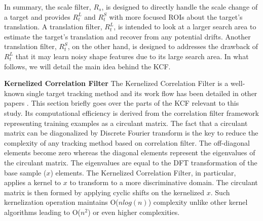 \documentclass[10pt,twocolumn,letterpaper]{article}
\begin{document}
In summary, the scale filter, $R_{s}$, is designed to directly handle
the scale change of a target and provides $R_{t}^{L}$ and $R_{t}^{S}$
with more focused ROIs about the target's translation. A translation
filter, $R_{t}^{L}$, is intended to look at a larger search area to
estimate the target's translation and recover from any potential
drifts. Another translation filter, $R_{t}^{S}$, on the other hand, is
designed to addresses the drawback of $R_{t}^{L}$ that it may learn
noisy shape features due to its large search area. In what follows, we
will detail the main idea behind the KCF.

\textbf{Kernelized Correlation Filter} The Kernelized Correlation
Filter is a well-known single target tracking method and its work
flow has been detailed in other papers
\cite{henriques2012exploiting,henriques2015high}. This section briefly
goes over the parts of the KCF relevant to this study. Its
computational efficiency is derived from the correlation filter
framework representing training examples as a circulant matrix. The
fact that a circulant matrix can be diagonalized by Discrete Fourier
transform is the key to reduce the complexity of any tracking method
based on correlation filter. The off-diagonal elements become zero
whereas the diagonal elements represent the eigenvalues of the
circulant matrix. The eigenvalues are equal to the DFT transformation
of the base sample ($x$) elements. The Kernelized Correlation Filter,
in particular, applies a kernel to $x$ to transform to a more
discriminative domain. The circulant matrix is then formed by applying
cyclic shifts on the kernelized $x$. Such kernelization operation
maintains O($nlog(n)$) complexity unlike other kernel algorithms
leading to O($n^{2}$) or even higher complexities.
\end{document}
